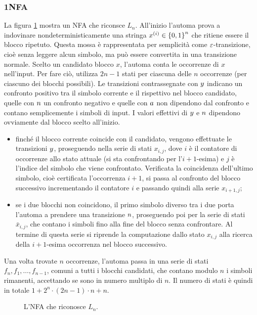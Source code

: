 \subsubsection{1NFA}
La figura \ref{img:wit:LnNFA} mostra un NFA che riconsce $L_n$. All'inizio l'automa prova a indovinare nondeterministicamente una stringa $x^{(i)}\in\left\{ 0,1 \right\}^n$ che ritiene essere il blocco ripetuto. Questa mossa è rappresentata per semplicità come $\varepsilon$-transizione, cioè senza leggere alcun simbolo, ma può essere convertita in una transizione normale. Scelto un candidato blocco $x$, l'automa conta le occorrenze di $x$ nell'input. Per fare ciò, utilizza $2n-1$ stati per ciascuna delle $n$ occorrenze (per ciascuno dei blocchi possibili). Le transizioni contrassegnate con $y$ indicano un confronto positivo tra il simbolo corrente e il rispettivo nel blocco candidato, quelle con $n$ un confronto negativo e quelle con $a$ non dipendono dal confronto e contano semplicemente i simboli di input. I valori effettivi di $y$ e $n$ dipendono ovviamente dal blocco scelto all'inizio.
\begin{itemize}
	\item finché il blocco corrente coincide con il candidato, vengono effettuate le transizioni $y$, proseguendo nella serie di stati $x_{i,j}$, dove $i$ è il contatore di occorrenze allo stato attuale (si sta confrontando per l'$i+1$-esima) e $j$ è l'indice del simbolo che viene confrontato. Verificata la coincidenza dell'ultimo simbolo, cioè certificata l'occorrenza $i+1$, si passa al confronto del blocco successivo incrementando il contatore $i$ e passando quindi alla serie $x_{i+1,j}$;
	\item se i due blocchi non coincidono, il primo simbolo diverso tra i due porta l'automa a prendere una transizione $n$, proseguendo poi per la serie di stati $\bar x_{i,j}$, che contano i simboli fino alla fine del blocco senza confrontare. Al termine di questa serie si riprende la computazione dallo stato $x_{i,j}$ alla ricerca della $i+1$-esima occorrenza nel blocco successivo.
\end{itemize}
Una volta trovate $n$ occorrenze, l'automa passa in una serie di stati $f_n,f_1,\dots,f_{n-1}$, comuni a tutti i blocchi candidati, che contano modulo $n$ i simboli rimanenti, accettando se sono in numero multiplo di $n$. Il numero di stati è quindi in totale $1+2^n\cdot (2n-1)\cdot n+n$.

\begin{figure}
	\centering
	
	\caption{L'NFA che riconosce $L_n$.}
	\label{img:wit:LnNFA}
\end{figure}

